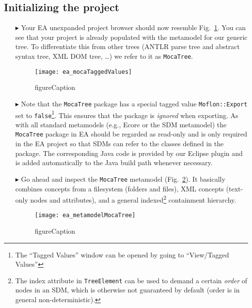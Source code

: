 \newpage
\hypertarget{M2TSettingUp vis}{}
\subsection{Initializing the project}
\visHeader

\begin{enumerate}

\item[$\blacktriangleright$] Your EA unexpanded project browser should now resemble Fig.~\ref{ea:mocaTagged}. You can see that your project is already populated
with the metamodel for our generic tree. To differentiate this from other trees (ANTLR parse tree and abstract syntax tree, XML DOM tree, \ldots) we refer to it
as \texttt{MocaTree}.

\begin{figure}[htpb]
\begin{center}
  \texttt{[image: ea\_mocaTaggedValues]}
  \caption{figureCaption}
  \label{ea:mocaTagged}
\end{center}
\end{figure}

\item[$\blacktriangleright$] Note that the \texttt{MocaTree} package has a special tagged value \texttt{Moflon::Export} set to \texttt{false}\footnote{The
``Tagged Values'' window can be opened by going to ``View/Tagged Values''}. This ensures that the package is \emph{ignored} when exporting. As with all standard
metamodels (e.g., Ecore or the SDM metamodel) the \texttt{MocaTree} package in EA should be regarded as read-only and is only required in the EA project so that
SDMs can refer to the classes defined in the package. The corresponding Java code is provided by our Eclipse plugin and is added automatically to the Java build
path whenever necessary.

\item[$\blacktriangleright$] Go ahead and inspect the \texttt{MocaTree} metamodel (Fig.~\ref{ea:mocaTree}). It basically combines concepts from a filesystem
(folders and files), XML concepts (text-only nodes and attributes), and a general indexed\footnote{The index attribute in \texttt{TreeElement} can be used to
demand a certain \emph{order} of nodes in an SDM, which is otherwise not guaranteed by default (order is in general non-deterministic).} containment hierarchy.

\begin{figure}[htpb]
\begin{center}
  \texttt{[image: ea\_metamodelMocaTree]}
  \caption{figureCaption}
  \label{ea:mocaTree}
\end{center}
\end{figure}
 

\end{enumerate}

